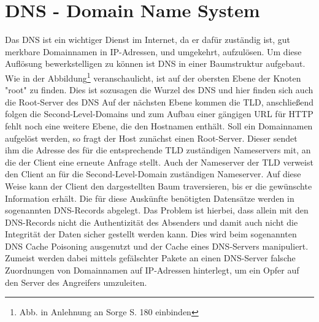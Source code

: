 \chapter{DNS - Domain Name System}
\label{chap:dns}
	Das \ac{DNS} ist ein wichtiger Dienst im Internet, da er dafür zuständig ist, gut merkbare Domainnamen in \ac{IP}-Adressen, und umgekehrt, aufzulösen.
	Um diese Auflösung bewerkstelligen zu können ist \ac{DNS} in einer Baumstruktur aufgebaut. 
	Wie in der Abbildung\footnote{Abb. in Anlehnung an Sorge S. 180 einbinden} veranschaulicht, ist auf der obersten Ebene der Knoten "root" zu finden.
	Dies ist sozusagen die Wurzel des \ac{DNS} und hier finden sich auch die Root-Server des \ac{DNS}
	Auf der nächsten Ebene kommen die \ac{TLD}, anschließend folgen die Second-Level-Domains und zum Aufbau einer gängigen \ac{URL} für \ac{HTTP} fehlt noch eine weitere Ebene, die den Hostnamen enthält.
	Soll ein Domainnamen aufgelöst werden, so fragt der Host zunächst einen Root-Server.
	Dieser sendet ihm die Adresse des für die entsprechende \ac{TLD} zuständigen Nameservers mit, an die der Client eine erneute Anfrage stellt.
	Auch der Nameserver der \ac{TLD} verweist den Client an für die Second-Level-Domain zuständigen Nameserver.
	Auf diese Weise kann der Client den dargestellten Baum traversieren, bis er die gewünschte Information erhält.
	Die für diese Auskünfte benötigten Datensätze werden in sogenannten \ac{DNS}-Records abgelegt.
	Das Problem ist hierbei, dass allein mit den \ac{DNS}-Records nicht die Authentizität des Absenders und damit auch nicht die Integrität der Daten sicher gestellt werden kann.
	Dies wird beim sogenannten \ac{DNS} Cache Poisoning %
 	ausgenutzt und der Cache eines \ac{DNS}-Servers manipuliert.
	Zumeist werden dabei mittels gefälschter Pakete an einen \ac{DNS}-Server falsche Zuordnungen von Domainnamen auf \ac{IP}-Adressen hinterlegt, um ein Opfer auf den Server des Angreifers umzuleiten.
